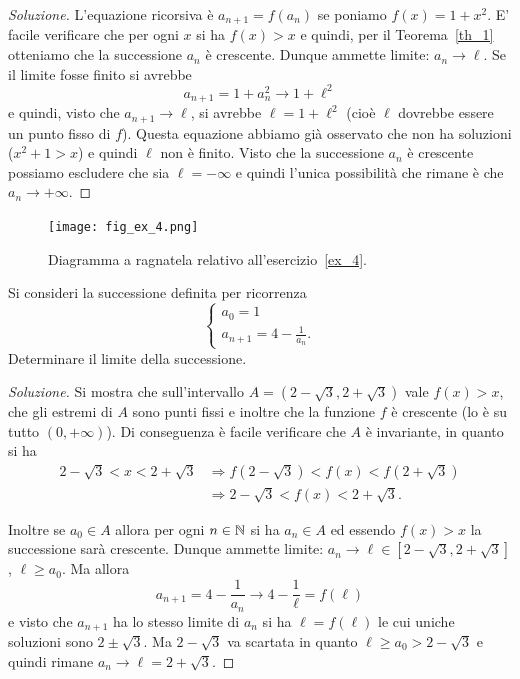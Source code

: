 \begin{proof}[Soluzione]
  L'equazione ricorsiva è $a_{n+1}=f(a_n)$ se poniamo $f(x) = 1+x^2$.
  E' facile verificare che per ogni $x$ si ha $f(x) > x$ e quindi, per
  il Teorema~\ref{th_1} otteniamo che la successione $a_n$ è
  crescente. Dunque ammette limite: $a_n \to \ell$. Se il limite fosse
  finito si avrebbe
  \[
  a_{n+1} = 1 + a_n^2 \to 1 + \ell^2
  \]
  e quindi, visto che $a_{n+1}\to \ell$, si avrebbe $\ell = 1 +
  \ell^2$ (cioè $\ell$ dovrebbe essere un punto fisso di $f$). Questa
  equazione abbiamo già osservato che non ha soluzioni ($x^2 + 1 > x$)
  e quindi $\ell$ non è finito. Visto che la successione $a_n$ è
  crescente possiamo escludere che sia $\ell=-\infty$ e quindi l'unica
  possibilità che rimane è che $a_n \to +\infty$.
\end{proof}

\begin{figure}
  \begin{center}
  \texttt{[image: fig\_ex\_4.png]}
  \end{center}
  \caption{Diagramma a ragnatela relativo
    all'esercizio~\ref{ex_4}.}
  \label{fig_ex_4}
\end{figure}

\begin{exercise}\label{ex_4}
  Si consideri la successione definita per ricorrenza
  \[
  \begin{cases}
    a_0 = 1\\
    a_{n+1} =4-\frac 1 {a_n}.
  \end{cases}
  \]
  Determinare il limite della successione.
\end{exercise}

\begin{proof}[Soluzione]
  Si mostra che sull'intervallo $A=(2-\sqrt 3, 2+\sqrt 3)$
  vale $f(x)>x$, che gli estremi di $A$ sono punti fissi
  e inoltre che la funzione $f$ è crescente (lo è su tutto $(0,+\infty)$).
  Di conseguenza è facile verificare che $A$ è invariante, in quanto si ha
  \begin{align*}
  2-\sqrt 3 < x < 2+\sqrt 3 &\Rightarrow
  f(2-\sqrt 3) < f(x) < f(2+\sqrt 3)\\
  &\Rightarrow
  2-\sqrt 3 < f(x) < 2+\sqrt 3.
  \end{align*}

  Inoltre se $a_0 \in A$ allora per ogni $n\in\mathbb N$ si ha $a_n\in A$ ed essendo
  $f(x)>x$ la successione sarà crescente. Dunque ammette
  limite: $a_n \to \ell \in [2-\sqrt 3,2+\sqrt 3]$, $\ell \ge a_0$.
  Ma allora
  \[
  a_{n+1} = 4-\frac 1 {a_n} \to 4 - \frac 1 \ell = f(\ell)
  \]
  e visto che $a_{n+1}$ ha lo stesso limite di $a_n$ si ha $\ell =
  f(\ell)$ le cui uniche soluzioni sono $2\pm \sqrt 3$. Ma $2-\sqrt 3$
  va scartata in quanto $\ell\ge a_0 > 2-\sqrt 3$ e quindi rimane
  $a_n \to \ell = 2+\sqrt 3$.
\end{proof}

